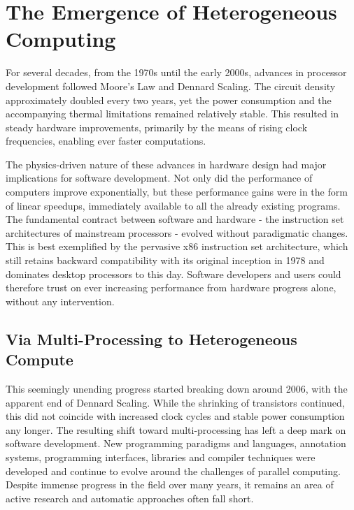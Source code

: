 \section{The Emergence of Heterogeneous Computing}

    For several decades, from the 1970s until the early 2000s, advances in
    processor development followed Moore's Law and Dennard Scaling.
    The circuit density approximately doubled every two years, yet the power
    consumption and the accompanying thermal limitations remained relatively
    stable.
    This resulted in steady hardware improvements, primarily by the means of
    rising clock frequencies, enabling ever faster computations.

    The physics-driven nature of these advances in hardware design had major
    implications for software development.
    Not only did the performance of computers improve exponentially, but these
    performance gains were in the form of linear speedups, immediately available
    to all the already existing programs.
    The fundamental contract between software and hardware - the
    instruction set architectures of mainstream processors - evolved without
    paradigmatic changes.
    This is best exemplified by the pervasive x86 instruction set architecture,
    which still retains backward compatibility with its original inception in
    1978 and dominates desktop processors to this day.
    Software developers and users could therefore trust on ever increasing
    performance from hardware progress alone, without any intervention.

\subsection{Via Multi-Processing to Heterogeneous Compute}

    This seemingly unending progress started breaking down around 2006,
    with the apparent end of Dennard Scaling.
    While the shrinking of transistors continued, this did not coincide with
    increased clock cycles and stable power consumption any longer.
    The resulting shift toward multi-processing has left a deep mark on
    software development.
    New programming paradigms and languages, annotation systems, programming
    interfaces, libraries and compiler techniques were developed and continue to
    evolve around the challenges of parallel computing.
    Despite immense progress in the field over many years, it remains an area
    of active research and automatic approaches often fall short.

